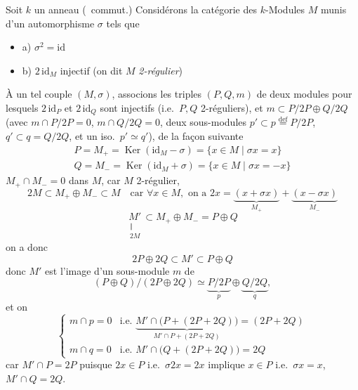 \documentclass[11pt,a4paper]{article}
\begin{document}
Soit $k$ un anneau (\ commut.)
Considérons la catégorie des $k$-Modules $M$ munis d'un automorphisme
$\sigma$  tels que
\begin{itemize}
  \item a) $\sigma^{2} = \mathrm{id}$
  \item b) $2\,\mathrm{id}_{M}$ injectif (on dit  $M$
    \emph{2-régulier})
\end{itemize}
À un tel couple $(M, \sigma)$, associons les triples $(P, Q, m)$ de deux
modules pour lesquels $2\,\mathrm{id}_{P}$ et $2\,\mathrm{id}_{Q}$
sont injectifs (i.e.\ $P, Q$ 2-réguliers), et
$m \subset P/2P \oplus Q/2Q$  (avec
$m \cap P/2P = 0$, $m \cap Q/2Q = 0$,  deux sous-modules $p' \subset p \overset{\mathrm{def}}{=} P/2P$, $q' \subset q = Q/2Q$, et
un iso.\ $p' \simeq q'$), de la façon suivante
\[
\begin{array}{l}
  P = M_{+} = \operatorname{Ker}(\mathrm{id}_{M} - \sigma)
    = \{x \in M \mid \sigma x = x\} \\
  Q = M_{-} = \operatorname{Ker}(\mathrm{id}_{M} + \sigma)
    = \{x \in M \mid \sigma x = -x\}
\end{array}
\]
 $M_{+} \cap M_{-} = 0$ dans $M$, car $M$ 2-régulier, 
\[
  2M \subset M_{+} \oplus M_{-} \subset M
  \quad \text{car } \forall x \in M, \text{ on a }
  2x = \underbrace{(x + \sigma x)}_{M_{+}} + \underbrace{(x - \sigma x)}_{M_{-}}
\]
\[
  \underset{\substack{\Vert \\ 2M}}{M'} \subset M_{+} \oplus M_{-} = P \oplus Q
\]
on a donc
\struck{\ill{}}
\[
  2P \oplus 2Q \subset M' \subset P \oplus Q
\]
donc $M'$ est l'image d'un sous-module $m$ de
\[
  (P \oplus Q)/(2P \oplus 2Q) \simeq \underbrace{P/2P}_{p} \oplus
  \underbrace{Q/2Q}_{q} ,
\]
et on 
\[
\begin{cases}
  m \cap p = 0 & \text{i.e.\ }
    \underbrace{M' \cap \bigl(P + (2P + 2Q)\bigr)}_{M' \cap P + (2P + 2Q)}
    = (2P + 2Q) \\
  m \cap q = 0 & \text{i.e.\ } M' \cap \bigl(Q + (2P + 2Q)\bigr) = 2Q
\end{cases}
\]
car $M' \cap P = 2P$ puisque $2x \in P$ i.e.\ $\sigma 2x = 2x$ implique
$x \in P$ i.e.\ $\sigma x = x$,  $M' \cap Q = 2Q$.
\end{document}
